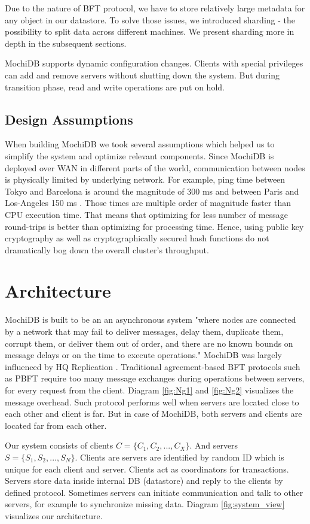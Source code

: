\documentclass[letterpaper,twocolumn,10pt]{article}
\begin{document}
Due to the nature of BFT protocol, we have to store relatively large metadata for any object in our datastore. To solve those issues, we introduced sharding - the possibility to split data across different machines. We present sharding more in depth in the subsequent sections.  

MochiDB supports dynamic configuration changes. Clients with special privileges can add and remove servers without shutting down the system. But during transition phase, read and write operations are put on hold.

\subsection{Design Assumptions}
When building MochiDB we took several assumptions which helped us to simplify the system and optimize relevant components. Since MochiDB is deployed over WAN in different parts of the world, communication between nodes is physically limited by underlying network. For example, ping time between Tokyo and Barcelona is around the magnitude of 300 ms and between Paris and Los-Angeles 150 ms \cite{PingLatencies}. Those times are multiple order of magnitude faster than CPU execution time. That means that optimizing for less number of message round-trips is better than optimizing for processing time. Hence, using public key cryptography as well as cryptographically secured hash functions do not dramatically bog down the overall cluster's throughput. 

\section{Architecture}
MochiDB is built to be an an asynchronous system "where nodes are connected by a network that may fail to deliver messages, delay them, duplicate them, corrupt them, or
deliver them out of order, and there are no known bounds on message delays or on the time to execute operations." \cite{HQ_replication}
MochiDB was largely influenced by HQ Replication \cite{HQ_replication}. Traditional agreement-based BFT protocols such as PBFT \cite{Practical_BFT} require too many message exchanges during operations between servers, for every request from the client.  Diagram \ref{fig:Ng1} and \ref{fig:Ng2}  visualizes the message overhead. Such protocol performs well when servers are located close to each other and client is far. But in case of MochiDB, both servers and clients are located far from each other.

Our system consists of clients \( C = \{ C_{1},C_{2}, ..., C_{X} \} \). And servers \( S = \{ S_{1}, S_{2}, ..., S_{N} \} \). Clients are servers are identified by random ID which is unique for each client and server. Clients act as coordinators for transactions. Servers store data inside internal DB (datastore) and reply to the clients by defined protocol. Sometimes servers can initiate communication and talk to other servers, for example to synchronize missing data.  Diagram \ref{fig:system_view} visualizes our architecture.
\end{document}
